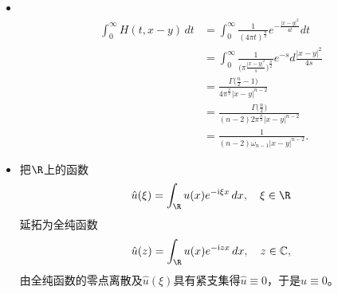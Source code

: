\begin{itemize}
\textbf{方法II.} 记左式积分为$I$, 可展开为
\begin{align*}
I&=\int_{\R^n}H(t,x-y) H(s,y-z) \,dy\\
&=\int_{\R^n}\frac{\exp \left(-\frac{(x-y)^2}{4t}-\frac{(y-z)^2}{4s}\right)}
{(4\pi t)^{\frac{n}{2}}(4\pi s)^{\frac{n}{2}}}\,dy\\
&=D\int_{\R^n}\exp\,(-(Ay^2-By+C))\,dy,
\end{align*}
其中定义
$$
D=\frac{1}{(4\pi t)^{\frac{n}{2}}(4\pi s)^{\frac{n}{2}}},\quad 
A=\frac{1}{4t}+\frac{1}{4s},\quad B=\frac{x}{2t}+\frac{z}{2s},\quad 
C=\frac{x^2}{4t}+\frac{z^2}{4s}.
$$
考虑配凑平方有
\begin{align*}
I&=D\exp \left(\frac{B^2}{4A}-C\right) \int_{\mathbb{R}^n}{\exp \left(-A\left(y-\frac{B}{2A}\right)^2\right) \,dy}\\
&=D\exp \left(\frac{B^2}{4A}-C\right) \left(\int_{\mathbb{R}}{\exp \left(-Ay^2\right) dy}\right)^n\\
&=D\left(\frac{\sqrt{\pi}}{\sqrt{A}}\right)^n\exp \left(\frac{B^2}{4A}-C\right).
\end{align*}
分别计算
\begin{align*}
D\left(\frac{\pi}{A}\right)^{\frac{n}{2}}
&=\frac{1}{(4\pi t)^{\frac{n}{2}}(4\pi s)^{\frac{n}{2}}}
\left(\frac{4\pi}{\frac{s+t}{st}}\right)^{\frac{n}{2}}
=\frac{1}{(4\pi(s+t))^{\frac{n}{2}}},
\\
\frac{B^2}{4A}-C&=\frac{\left(\frac{x}{2t}+\frac{z}{2s}\right)^2}{\frac{1}{t}+\frac{1}{s}}
-\left(\frac{x^2}{4t}+\frac{z^2}{4s}\right) 
=-\frac{(x-z)^2}{4(s+t)},
\end{align*}
可见计算结果正是$H(s+t,x-z)$.

\item[9.]\ \begin{align*}
    \int_0^\infty H(t,x-y)\,dt
    &=\int_0^\infty \frac{1}{(4\pi t)^{\frac{n}{2}}}e^{-\frac{|x-y|^2}{4t}}dt\\
    &=\int_0^\infty \frac{1}{\big(\pi \frac{|x-y|^2}{s}\big)^{\frac{n}{2}}}e^{-s}d\frac{|x-y|^2}{4s}\\
    &=\frac{\varGamma\big(\frac{n}{2}-1\big)}{4\pi^\frac{n}{2}|x-y|^{n-2}}\\
    &=\frac{\varGamma\big(\frac{n}{2}\big)}{(n-2)2\pi^\frac{n}{2}|x-y|^{n-2}}\\
    &=\frac{1}{(n-2)\omega_{n-1}|x-y|^{n-2}}.
\end{align*}

\item[11.] 把$\R$上的函数
\[\hat{u}(\xi)=\int_\R u(x)e^{-{\rm i}\xi x}\,dx, \quad \xi\in\R\]
延拓为全纯函数
\[\hat{u}(z)=\int_\R u(x)e^{-{\rm i}zx}\,dx, \quad z\in\mathbb{C},\]
由全纯函数的零点离散及$\hat{u}(\xi)$具有紧支集得$\hat{u}\equiv0$，于是$u\equiv0$。
\end{itemize}

